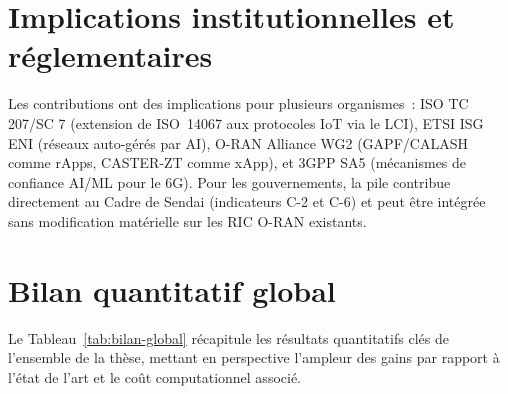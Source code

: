 \section{Implications institutionnelles et réglementaires}\label{sec:concl-institutions}

Les contributions ont des implications pour plusieurs organismes~: ISO TC 207/SC 7 (extension de ISO~14067 aux protocoles IoT via le LCI), ETSI ISG ENI (réseaux auto-gérés par AI), O-RAN Alliance WG2 (GAPF/CALASH comme rApps, CASTER-ZT comme xApp), et 3GPP SA5 (mécanismes de confiance AI/ML pour le 6G). Pour les gouvernements, la pile contribue directement au Cadre de Sendai \cite{UNDRR2015Sendai} (indicateurs C-2 et C-6) et peut être intégrée sans modification matérielle sur les RIC O-RAN existants.


\section{Bilan quantitatif global}\label{sec:concl-bilan}

Le Tableau~\ref{tab:bilan-global} récapitule les résultats quantitatifs clés de l'ensemble de la thèse, mettant en perspective l'ampleur des gains par rapport à l'état de l'art et le coût computationnel associé.

\begin{table}[htbp]
\centering
\caption{Bilan quantitatif global de la thèse~: gains clés par rapport à l'état de l'art.}
\label{tab:bilan-global}
\end{table}

